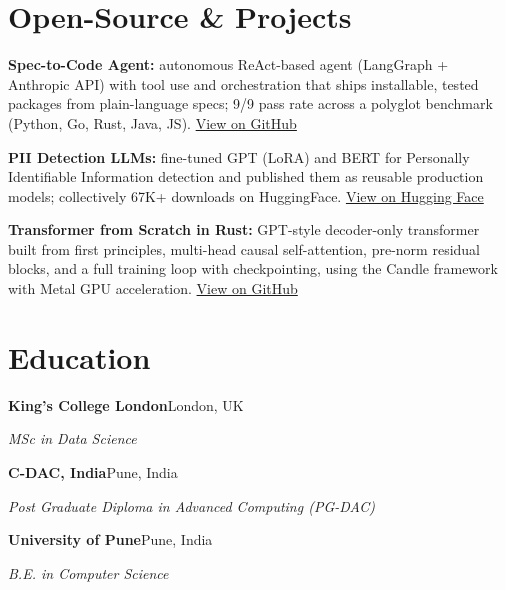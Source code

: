 \documentclass[10pt,a4paper]{article}
\begin{document}
\section{Open-Source \& Projects}
\begin{tight}
  \item \textbf{Spec-to-Code Agent:} autonomous ReAct-based agent (LangGraph + Anthropic API) with tool use and orchestration that ships installable, tested packages from plain-language specs; 9/9 pass rate across a polyglot benchmark (Python, Go, Rust, Java, JS). \href{https://github.com/abhijeetscode/Spec-to-Code-Agent}{View on GitHub}
  \item \textbf{PII Detection LLMs:} fine-tuned GPT (LoRA) and BERT for Personally Identifiable Information detection and published them as reusable production models; collectively 67K+ downloads on HuggingFace. \href{https://huggingface.co/ab-ai/pii_model}{View on Hugging Face}
  \item \textbf{Transformer from Scratch in Rust:} GPT-style decoder-only transformer built from first principles, multi-head causal self-attention, pre-norm residual blocks, and a full training loop with checkpointing, using the Candle framework with Metal GPU acceleration. \href{https://github.com/abhijeetscode/transformer-rust}{View on GitHub}
\end{tight}

\section{Education}
{\color{company}\bfseries King's College London}\hfill {\color{muted}London, UK}\par
{\itshape MSc in Data Science}\par\vspace{1pt}
{\color{company}\bfseries C-DAC, India}\hfill {\color{muted}Pune, India}\par
{\itshape Post Graduate Diploma in Advanced Computing (PG-DAC)}\par\vspace{1pt}
{\color{company}\bfseries University of Pune}\hfill {\color{muted}Pune, India}\par
{\itshape B.E. in Computer Science}\par
\end{document}
